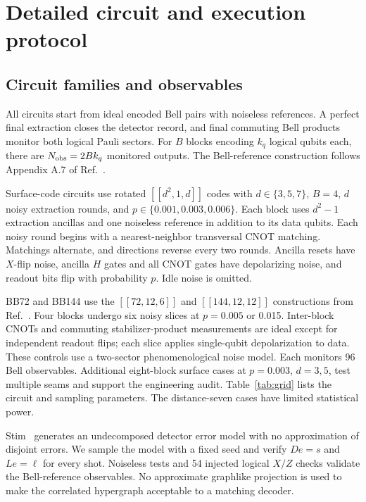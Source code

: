 \appendix
\renewcommand{\thesection}{\Alph{section}}
\section{Detailed circuit and execution protocol}\label{app:protocol}
\subsection{Circuit families and observables}
All circuits start from ideal encoded Bell pairs with noiseless references. A perfect final extraction closes the detector record, and final commuting Bell products monitor both logical Pauli sectors. For $B$ blocks encoding $k_q$ logical qubits each, there are $N_{\rm obs}=2Bk_q$ monitored outputs. The Bell-reference construction follows Appendix A.7 of Ref.~\cite{tour}.

Surface-code circuits use rotated $[[d^2,1,d]]$ codes with $d\in\{3,5,7\}$, $B=4$, $d$ noisy extraction rounds, and $p\in\{0.001,0.003,0.006\}$. Each block uses $d^2-1$ extraction ancillas and one noiseless reference in addition to its data qubits. Each noisy round begins with a nearest-neighbor transversal CNOT matching. Matchings alternate, and directions reverse every two rounds. Ancilla resets have $X$-flip noise, ancilla $H$ gates and all CNOT gates have depolarizing noise, and readout bits flip with probability $p$. Idle noise is omitted.

BB72 and BB144 use the $[[72,12,6]]$ and $[[144,12,12]]$ constructions from Ref.~\cite{bbpre}. Four blocks undergo six noisy slices at $p=0.005$ or 0.015. Inter-block CNOTs and commuting stabilizer-product measurements are ideal except for independent readout flips; each slice applies single-qubit depolarization to data. These controls use a two-sector phenomenological noise model. Each monitors 96 Bell observables. Additional eight-block surface cases at $p=0.003$, $d=3,5$, test multiple seams and support the engineering audit. Table~\ref{tab:grid} lists the circuit and sampling parameters. The distance-seven cases have limited statistical power.

Stim~\cite{stim} generates an undecomposed detector error model with no approximation of disjoint errors. We sample the model with a fixed seed and verify $De=s$ and $Le=\ell$ for every shot. Noiseless tests and 54 injected logical $X/Z$ checks validate the Bell-reference observables. No approximate graphlike projection is used to make the correlated hypergraph acceptable to a matching decoder.

